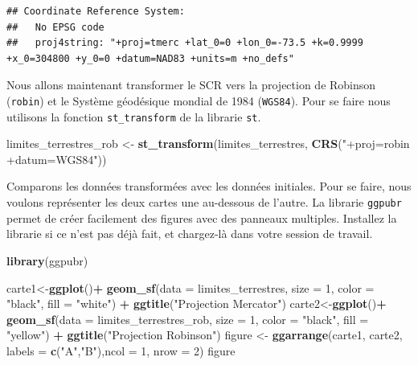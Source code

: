 \documentclass[]{article}
\newenvironment{Shaded}{\begin{snugshade}}{\end{snugshade}}
\newcommand{\KeywordTok}[1]{\textcolor[rgb]{0.13,0.29,0.53}{\textbf{#1}}}
\newcommand{\DataTypeTok}[1]{\textcolor[rgb]{0.13,0.29,0.53}{#1}}
\newcommand{\DecValTok}[1]{\textcolor[rgb]{0.00,0.00,0.81}{#1}}
\newcommand{\StringTok}[1]{\textcolor[rgb]{0.31,0.60,0.02}{#1}}
\newcommand{\OperatorTok}[1]{\textcolor[rgb]{0.81,0.36,0.00}{\textbf{#1}}}
\newcommand{\NormalTok}[1]{#1}
\begin{document}
\begin{verbatim}
## Coordinate Reference System:
##   No EPSG code
##   proj4string: "+proj=tmerc +lat_0=0 +lon_0=-73.5 +k=0.9999 +x_0=304800 +y_0=0 +datum=NAD83 +units=m +no_defs"
\end{verbatim}

Nous allons maintenant transformer le SCR vers la projection de Robinson
(\texttt{robin}) et le Système géodésique mondial de 1984
(\texttt{WGS84}). Pour se faire nous utilisons la fonction
\texttt{st\_transform} de la librarie \texttt{st}.

\begin{Shaded}
\begin{Highlighting}[]
\NormalTok{limites_terrestres_rob <-}\StringTok{ }\KeywordTok{st_transform}\NormalTok{(limites_terrestres,}
    \KeywordTok{CRS}\NormalTok{(}\StringTok{"+proj=robin +datum=WGS84"}\NormalTok{))}
\end{Highlighting}
\end{Shaded}

Comparons les données transformées avec les données initiales. Pour se
faire, nous voulons représenter les deux cartes une au-dessous de
l'autre. La librarie \texttt{ggpubr} permet de créer facilement des
figures avec des panneaux multiples. Installez la librarie si ce n'est
pas déjà fait, et chargez-là dans votre session de travail.

\begin{Shaded}
\begin{Highlighting}[]
\KeywordTok{library}\NormalTok{(ggpubr)}
\end{Highlighting}
\end{Shaded}

\begin{Shaded}
\begin{Highlighting}[]
\NormalTok{carte1<-}\KeywordTok{ggplot}\NormalTok{()}\OperatorTok{+}
\StringTok{  }\KeywordTok{geom_sf}\NormalTok{(}\DataTypeTok{data =}\NormalTok{ limites_terrestres, }\DataTypeTok{size =} \DecValTok{1}\NormalTok{, }\DataTypeTok{color =} \StringTok{"black"}\NormalTok{, }\DataTypeTok{fill =} \StringTok{"white"}\NormalTok{) }\OperatorTok{+}
\StringTok{  }\KeywordTok{ggtitle}\NormalTok{(}\StringTok{"Projection Mercator"}\NormalTok{)}
\NormalTok{carte2<-}\KeywordTok{ggplot}\NormalTok{()}\OperatorTok{+}
\StringTok{  }\KeywordTok{geom_sf}\NormalTok{(}\DataTypeTok{data =}\NormalTok{ limites_terrestres_rob, }\DataTypeTok{size =} \DecValTok{1}\NormalTok{, }\DataTypeTok{color =} \StringTok{"black"}\NormalTok{, }\DataTypeTok{fill =} \StringTok{"yellow"}\NormalTok{) }\OperatorTok{+}
\StringTok{  }\KeywordTok{ggtitle}\NormalTok{(}\StringTok{"Projection Robinson"}\NormalTok{)}
\NormalTok{figure <-}\StringTok{ }\KeywordTok{ggarrange}\NormalTok{(carte1, carte2, }\DataTypeTok{labels =} \KeywordTok{c}\NormalTok{(}\StringTok{"A"}\NormalTok{,}\StringTok{"B"}\NormalTok{),}\DataTypeTok{ncol =} \DecValTok{1}\NormalTok{, }\DataTypeTok{nrow =} \DecValTok{2}\NormalTok{)}
\NormalTok{figure}
\end{Highlighting}
\end{Shaded}
\end{document}
